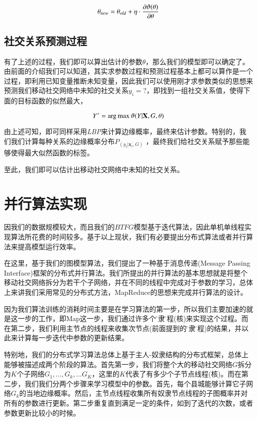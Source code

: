 \begin{equation}
\label{eq-learning}
\theta_{new} = \theta_{old} + \eta \cdot \frac{\partial \vartheta(\theta)}{\partial \theta} \\
\end{equation}


\subsection{社交关系预测过程}

有了上述的过程，我们即可以算出估计的参数$\theta$，那么我们的模型即可以确定了。由前面的介绍我们可以知道，其实求参数过程和预测过程基本上都可以算作是一个过程，即利用已知变量推断未知变量，因此我们可以使用刚才求参数类似的思想来预测我们移动社交网络中未知的社交关系${y_i = ?}$，即找到一组社交关系值，使得下面的目标函数的似然最大，

\begin{equation}
Y^{\ast} = \arg \max \vartheta(Y|\textbf{X},G,\theta) \\
\end{equation}

由上述可知，即可同样采用\textit{LBP}来计算边缘概率，最终来估计参数。特别的，我们我们计算每种关系的边缘概率分布$P_(y_i | \textbf{x}_i, G)$ ，最终我们给社交关系赋予那些能够使得最大似然函数的标签。

至此，我们即可以估计出移动社交网络中未知的社交关系。



\section{并行算法实现}

因我们的数据规模较大，而且我们的$BTFG$模型基于迭代算法，因此单机单线程实现算法所花费的时间较多。基于以上现状，我们有必要提出分布式算法或者并行算法来提高模型运行效率。

在这里，基于我们的图模型算法，我们提出了一种基于消息传递(Message Passing Interface)框架的分布式并行算法。我们所提出的并行算法的基本思想就是将整个移动社交网络拆分为若干个子网络，并在不同的线程中完成对于参数的学习，总体上来讲我们采用常见的分布式方法，MapReduce的思想来完成并行算法的设计。

因为我们算法训练的消耗时间主要是在学习算法的第一步，所以我们主要加速的就是这一步的工作，即Map这一步，我们通过许多个\"奴隶\"线程(核)来实现这个过程。而在第二步，我们利用主节点的线程来收集次节点(前面提到的\"奴隶\"线程)的结果，并以此来计算每一步迭代中参数的更新结果。

特别地，我们的分布式学习算法总体上基于主人-奴隶结构的分布式框架，总体上能够被描述成两个阶段的算法。首先第一步，我们将整个大的移动社交网络$G$拆分为$K$个子网络$G_1,...,G_k,...G_K$，这里的$K$代表了有多少个子节点线程(核)。而在第二步，我们我们分两个步骤来学习模型中的参数。首先，每个县城能够计算它子网络$G_k$的当地边缘概率。然后，主节点线程收集所有奴隶节点线程的子图概率并对所有的参数进行更新。第二步重复直到满足一定的条件，如到了迭代的次数，或者参数更新比较小的时候。

